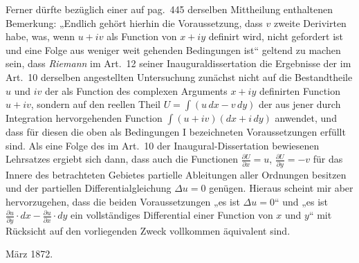 \documentclass{article}
\begin{document}
Ferner dürfte bezüglich einer auf pag.~445 derselben Mittheilung enthaltenen Bemerkung: „Endlich gehört hierhin die Voraussetzung, dass $v$ zweite Derivirten habe, was, wenn $u + iv$ als Function von $x + iy$ definirt wird, nicht gefordert ist und eine Folge aus weniger weit gehenden Bedingungen ist“ geltend zu machen sein, dass \emph{Riemann} im Art.~12 seiner Inauguraldissertation die Ergebnisse der im Art.~10 derselben angestellten Untersuchung zunächst nicht auf die Bestandtheile $u$ und $iv$ der als Function des complexen Arguments $x + iy$ definirten Function $u + iv$, sondern auf den reellen Theil $U = \displaystyle\int(u\,dx - v\,dy)$ der aus jener durch Integration hervorgehenden Function $\displaystyle\int(u + iv)(dx + i\,dy)$ anwendet, und dass für diesen die oben als Bedingungen I bezeichneten Voraussetzungen erfüllt sind. Als eine Folge des im Art.~10 der Inaugural-Dissertation bewiesenen Lehrsatzes ergiebt sich dann, dass auch die Functionen $\frac{\partial U}{\partial x} = u$, $\frac{\partial U}{\partial y} = -v$ für das Innere des betrachteten Gebietes partielle Ableitungen aller Ordnungen besitzen und der partiellen Differentialgleichung $\Delta u = 0$ genügen. Hieraus scheint mir aber hervorzugehen, dass die beiden Voraussetzungen „es ist $\Delta u = 0$“ und „es ist $\frac{\partial u}{\partial y} \cdot dx - \frac{\partial u}{\partial x} \cdot dy$ ein vollständiges Differential einer Function von $x$ und $y$“ mit Rücksicht auf den vorliegenden Zweck vollkommen äquivalent sind.

März 1872.
\end{document}
